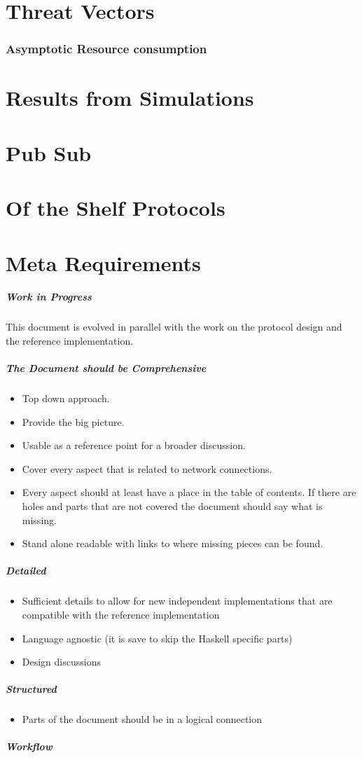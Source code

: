 \documentclass{report}
\theoremstyle{definition}{
  \newtheorem{lemma}{Lemma}[section] %
  \newtheorem{definition}[lemma]{Definition}
}
\theoremstyle{theorem}{
  \newtheorem{invariant}[lemma]{Invariant}
  \newtheorem{proofobligation}[lemma]{Proof Obligation}
}
\numberwithin{equation}{lemma}
\begin{document}
\section{Threat Vectors}
\subsubsection{Asymptotic Resource consumption}
\section{Results from Simulations}
\section{Pub Sub}
\section{Of the Shelf Protocols}
\section{Meta Requirements}
\subparagraph{Work in Progress}
This document is evolved in parallel with the work on the protocol design and
the reference implementation.

\subparagraph{The Document should be Comprehensive}
\begin{itemize}
\item Top down approach.
\item Provide the big picture.
\item Usable as a reference point for a broader discussion.
\item Cover every aspect that is related to network connections.
\item Every aspect should at least have a place in the table of contents.
  If there are holes and parts that are not covered the document should say what is missing.
\item Stand alone readable with links to where missing pieces can be found.
\end{itemize}

\subparagraph{Detailed}
\begin{itemize}
\item Sufficient details to allow for new independent implementations that are compatible with
the reference implementation
\item Language agnostic (it is save to skip the Haskell specific parts)
\item Design discussions
\end{itemize}
\subparagraph{Structured}
\begin{itemize}
\item Parts of the document should be in a logical connection
\end{itemize}
\subparagraph{Workflow}
\end{document}
